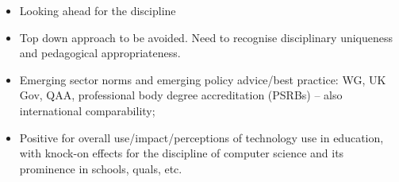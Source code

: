 \documentclass[sigconf]{acmart}
\begin{document}
\begin{itemize}
\item Looking ahead for the discipline
\item Top down approach to be avoided. Need to recognise disciplinary
uniqueness and pedagogical appropriateness.
\item Emerging sector norms and emerging policy advice/best practice:
WG, UK Gov, QAA, professional body degree accreditation (PSRBs) – also
international comparability;
\item Positive for overall use/impact/perceptions of technology use in
education, with knock-on effects for the discipline of computer
science and its prominence in schools, quals, etc.
\end{itemize}





\end{document}

